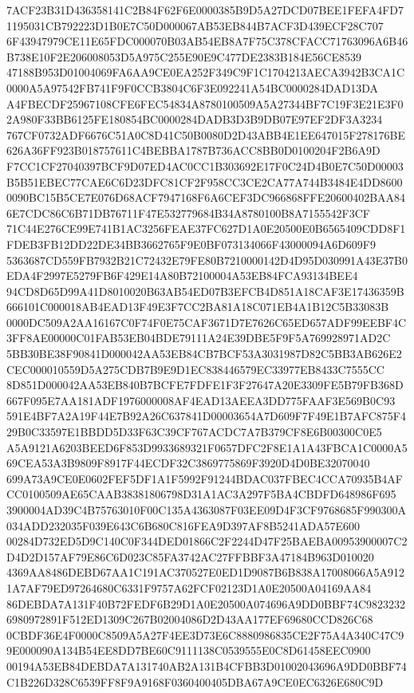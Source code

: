 \documentclass[UTF8,fontset=fandol,zihao=-4,a4paper]{ctexart}
\begin{document}
{{7ACF23B31D436358141C2B84F62F6E0000385B9D5A27DCD07BEE1FEFA4FD71195031CB792223D1B0E7C50D000067AB53EB844B7ACF3D439ECF28C707
6F43947979CE11E65FDC000070B03AB54EB8A7F75C378CFACC71763096A6B46B738E10F2E206008053D5A975C255E90E9C477DE2383B184E56CE8539
47188B953D01004069FA6AA9CE0EA252F349C9F1C1704213AECA3942B3CA1C0000A5A97542FB741F9F0CCB3804C6F3E092241A54BC0000284DAD13DA
A4FBECDF25967108CFE6FEC54834A8780100509A5A27344BF7C19F3E21E3F02A980F33BB6125FE180854BC0000284DADB3D3B9DB07E97EF2DF3A3234
767CF0732ADF6676C51A0C8D41C50B0080D2D43ABB4E1EE647015F278176BE626A36FF923B018757611C4BEBBA1787B736ACC8BB0D0100204F2B6A9D
F7CC1CF27040397BCF9D07ED4AC0CC1B303692E17F0C24D4B0E7C50D00003B5B51EBEC77CAE6C6D23DFC81CF2F958CC3CE2CA77A744B3484E4DD8600
0090BC15B5CE7E076D68ACF7947168F6A6CEF3DC966868FFE20600402BAA846E7CDC86C6B71DB76711F47E532779684B34A8780100B8A7155542F3CF
71C44E276CE99E741B1AC3256FEAE37FC627D1A0E20500E0B6565409CDD8F1FDEB3FB12DD22DE34BB3662765F9E0BF073134066F43000094A6D609F9
5363687CD559FB7932B21C72432E79FE80B7210000142D4D95D030991A43E37B0EDA4F2997E5279FB6F429E14A80B72100004A53EB84FCA93134BEE4
94CD8D65D99A41D8010020B63AB54ED07B3EFCB4D851A18CAF3E17436359B666101C000018AB4EAD13F49E3F7CC2BA81A18C071EB4A1B12C5B33083B
0000DC509A2AA16167C0F74F0E75CAF3671D7E7626C65ED657ADF99EEBF4C3FF8AE00000C01FAB53EB04BDE79111A24E39DBE5F9F5A769928971AD2C
5BB30BE38F90841D000042AA53EB84CB7BCF53A3031987D82C5BB3AB626E2CEC000010559D5A275CDB7B9E9D1EC838446579EC33977EB8433C7555CC
8D851D000042AA53EB840B7BCFE7FDFE1F3F27647A20E3309FE5B79FB368D667F095E7AA181ADF1976000008AF4EAD13AEEA3DD775FAAF3E569B0C93
591E4BF7A2A19F44E7B92A26C637841D00003654A7D609F7F49E1B7AFC875F429B0C33597E1BBDD5D33F63C39CF767ACDC7A7B379CF8E6B00300C0E5
A5A9121A6203BEED6F853D9933689321F0657DFC2F8E1A1A43FBCA1C0000A569CEA53A3B9809F8917F44ECDF32C3869775869F3920D4D0BE32070040
699A73A9CE0E0602FEF5DF1A1F5992F91244BDAC037FBEC4CCA70935B4AFCC0100509AE65CAAB38381806798D31A1AC3A297F5BA4CBDFD648986F695
3900004AD39C4B75763010F00C135A4363087F03EE09D4F3CF9768685F990300A034ADD232035F039E643C6B680C816FEA9D397AF8B5241ADA57E600
00284D732ED5D9C140C0F344DED01866C2F2244D47F25BAEBA00953900007C2D4D2D157AF79E86C6D023C85FA3742AC27FFBBF3A47184B963D010020
4369AA8486DEBD67AA1C191AC370527E0ED1D9087B6B838A17008066A5A9121A7AF79ED97264680C6331F9757A62FCF02123D1A0E20500A04169AA84
86DEBDA7A131F40B72FEDF6B29D1A0E20500A074696A9DD0BBF74C98232326980972891F512ED1309C267B02004086D2D43AA177EF69680CCD826C68
0CBDF36E4F0000C8509A5A27F4EE3D73E6C8880986835CE2F75A4A340C47C99E000090A134B54EE8DD7BE60C9111138C0539555E0C8D61458EEC0900
00194A53EB84DEBDA7A131740AB2A131B4CFBB3D01002043696A9DD0BBF74C1B226D328C6539FF8F9A9168F0360400405DBA67A9CE0EC6326E680C9D
}}
\end{document}
